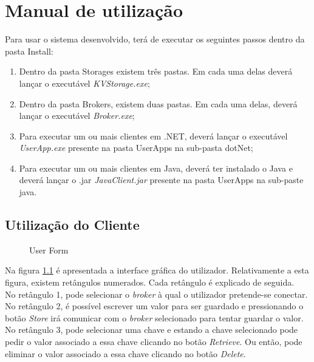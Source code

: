 \chapter{Manual de utilização} \label{manual}

Para usar o sistema desenvolvido, terá de executar os seguintes passos dentro da pasta Install:

\begin{enumerate}
	\item Dentro da pasta Storages existem três pastas. Em cada uma delas deverá lançar o executável \textit{KVStorage.exe};
	\item Dentro da pasta Brokers, existem duas pastas. Em cada uma delas, deverá lançar o executável \textit{Broker.exe};
	\item Para executar um ou mais clientes em .NET, deverá lançar o executável \textit{UserApp.exe} presente na pasta UserApps na sub-pasta dotNet;
	\item Para executar um ou mais clientes em Java, deverá ter instalado o Java e deverá lançar o .jar \textit{JavaClient.jar} presente na pasta UserApps na sub-paste java.
\end{enumerate}

\section{Utilização do Cliente}

\begin{figure}[h]
	\caption{User Form}
	\label{form}
\end{figure}

Na figura \ref{form} é apresentada a interface gráfica do utilizador.
Relativamente a esta figura, existem retângulos numerados. Cada retângulo é explicado de seguida.\\

No retângulo 1, pode selecionar o \textit{broker} à qual o utilizador pretende-se conectar.\\

No retângulo 2, é possível escrever um valor para ser guardado e pressionando o botão \textit{Store} irá comunicar com o \textit{broker} selecionado para tentar guardar o valor.\\

No retângulo 3, pode selecionar uma chave e estando a chave selecionado pode pedir o valor associado a essa chave clicando no botão \textit{Retrieve}. Ou então, pode eliminar o valor associado a essa chave clicando no botão \textit{Delete}.